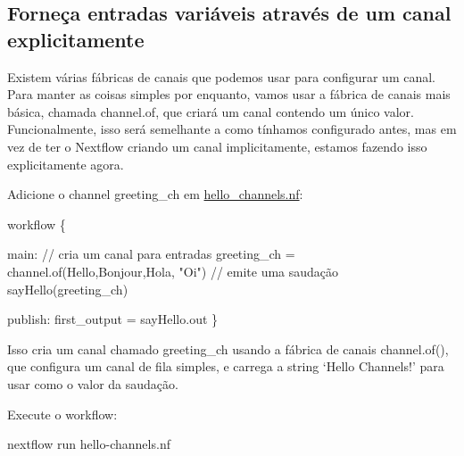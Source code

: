 \documentclass[
  brazilian,
  letterpaper,
  DIV=11,
  numbers=noendperiod]{scrreprt}
\newenvironment{Shaded}{\begin{snugshade}}{\end{snugshade}}
\newcommand{\CommentTok}[1]{\textcolor[rgb]{0.37,0.37,0.37}{#1}}
\newcommand{\ExtensionTok}[1]{\textcolor[rgb]{0.00,0.23,0.31}{#1}}
\newcommand{\FunctionTok}[1]{\textcolor[rgb]{0.28,0.35,0.67}{#1}}
\newcommand{\NormalTok}[1]{\textcolor[rgb]{0.00,0.23,0.31}{#1}}
\newcommand{\OperatorTok}[1]{\textcolor[rgb]{0.37,0.37,0.37}{#1}}
\newcommand{\StringTok}[1]{\textcolor[rgb]{0.13,0.47,0.30}{#1}}
\begin{document}
\subsection{Forneça entradas variáveis através de um canal
explicitamente}\label{forneuxe7a-entradas-variuxe1veis-atravuxe9s-de-um-canal-explicitamente}

Existem várias fábricas de canais que podemos usar para configurar um
canal. Para manter as coisas simples por enquanto, vamos usar a fábrica
de canais mais básica, chamada channel.of, que criará um canal contendo
um único valor. Funcionalmente, isso será semelhante a como tínhamos
configurado antes, mas em vez de ter o Nextflow criando um canal
implicitamente, estamos fazendo isso explicitamente agora.

Adicione o channel greeting\_ch em
\href{../hello_nextflow/hello-channels.nf}{hello\_channels.nf}:

\begin{Shaded}
\begin{Highlighting}[]

\NormalTok{workflow }\OperatorTok{\{}

\NormalTok{    main}\OperatorTok{:}
    \CommentTok{// cria um canal para entradas}
\NormalTok{    greeting\_ch }\OperatorTok{=}\NormalTok{ channel}\OperatorTok{.}\FunctionTok{of}\OperatorTok{(}\StringTok{\textquotesingle{}Hello\textquotesingle{}}\OperatorTok{,}\StringTok{\textquotesingle{}Bonjour\textquotesingle{}}\OperatorTok{,}\StringTok{\textquotesingle{}Hola\textquotesingle{}}\OperatorTok{,} \StringTok{"Oi"}\OperatorTok{)}
    \CommentTok{// emite uma saudação}
    \FunctionTok{sayHello}\OperatorTok{(}\NormalTok{greeting\_ch}\OperatorTok{)}

\NormalTok{    publish}\OperatorTok{:}
\NormalTok{    first\_output }\OperatorTok{=}\NormalTok{ sayHello}\OperatorTok{.}\NormalTok{out}
\OperatorTok{\}}
\end{Highlighting}
\end{Shaded}

Isso cria um canal chamado greeting\_ch usando a fábrica de canais
channel.of(), que configura um canal de fila simples, e carrega a string
`Hello Channels!' para usar como o valor da saudação.

Execute o workflow:

\begin{Shaded}
\begin{Highlighting}[]
\ExtensionTok{nextflow}\NormalTok{ run hello{-}channels.nf}
\end{Highlighting}
\end{Shaded}
\end{document}
